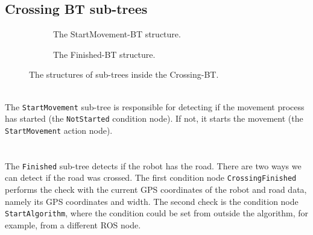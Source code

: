     \subsection{Crossing BT sub-trees}
        \begin{figure}[ht]
            \begin{subfigure}{0.45\textwidth}
                \caption{The StartMovement-BT structure.}
                \label{fig:StartMovement-BT}
            \end{subfigure}
            \begin{subfigure}{0.54\textwidth}
                \caption{The Finished-BT structure.}
                \label{fig:Finished-BT}
            \end{subfigure}
            \caption{The structures of sub-trees inside the Crossing-BT.}
        \end{figure}
        \\
            The \texttt{StartMovement} sub-tree is responsible for detecting if the movement process has started (the \texttt{NotStarted} condition node). If not, it starts the movement (the \texttt{StartMovement} action node).\\\\
        \\
            The \texttt{Finished} sub-tree detects if the robot has the road. There are two ways we can detect if the road was crossed. The first condition node \texttt{CrossingFinished} performs the check with the current GPS coordinates of the robot and road data, namely its GPS coordinates and width. The second check is the condition node \texttt{StartAlgorithm}, where the condition could be set from outside the algorithm, for example, from a different ROS node.\\
